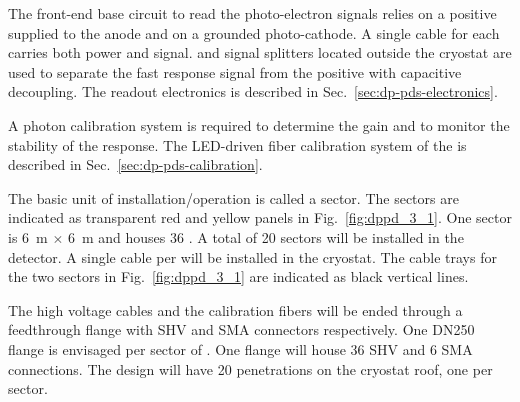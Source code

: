 The front-end  base circuit to read the photo-electron signals relies on a positive  supplied to the  anode and on a grounded photo-cathode. A single cable for each  carries both power and signal.  and signal splitters located outside the cryostat are used to separate the fast  response signal from the positive  with capacitive decoupling. The  readout electronics is described in Sec.~\ref{sec:dp-pds-electronics}.

A photon calibration system is required to determine the  gain and to monitor the stability of the  response. The LED-driven fiber calibration system of the  is described in Sec.~\ref{sec:dp-pds-calibration}. 

The basic unit of installation/operation is called a sector. The sectors are indicated as transparent red and yellow panels in Fig.~\ref{fig:dppd_3_1}. One \dual {} sector is \SI{6}{\m} $\times$ \SI{6}{\m} and houses \num{36} . A total of \num{20} sectors will be installed in the detector. A single  cable per  will be installed in the cryostat.
The cable trays for the two sectors in Fig.~\ref{fig:dppd_3_1} are indicated as black vertical lines.

The high voltage cables and the calibration fibers will be ended through a feedthrough flange with SHV and SMA connectors respectively. One DN250 flange is envisaged per sector of \dual {}. One flange will house \num{36} SHV and \num{6} SMA connections. The \dual {} design will have \num{20} penetrations on the cryostat roof, one per sector.

